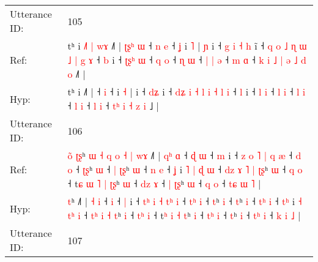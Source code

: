 \documentclass[10pt]{article}
\DeclareRobustCommand{\hl}[1]{{\textcolor{red}{#1}}}
\begin{document}
\begin{longtable}{ll}
 \\
\midrule
Utterance ID: & 105 \\
Ref: & tʰ i\hl{ }\hl{˩}\hl{˥}\hl{ }\hl{|}\hl{ }\hl{w}\hl{ɤ} ˩˥ |\hl{ }\hl{ʈ}\hl{ʂ}\hl{ʰ}\hl{ }\hl{ɯ} ˧\hl{ }\hl{n} \hl{e} ˧\hl{ }\hl{ʝ} i \hl{˥} |\hl{ }\hl{ɲ} i ˧\hl{ }\hl{g}\hl{ }\hl{i} \hl{˧}\hl{ }\hl{h} i\hl{̃} ˧ \hl{q}\hl{ }\hl{o} \hl{˩} \hl{ɳ} \hl{ɯ} \hl{˩} \hl{|} \hl{g} \hl{ɤ} ˧ \hl{b} i ˧ \hl{ʈ}\hl{ʂ}\hl{ʰ} \hl{ɯ} ˧ \hl{q} \hl{o} ˧ \hl{ɳ} \hl{ɯ} ˧\hl{ }\hl{|} \hl{|} \hl{ə} ˧ \hl{m} \hl{ɑ} ˧\hl{ }\hl{k}\hl{ }\hl{i} \hl{˩}\hl{ }\hl{|} \hl{ə} \hl{˩} \hl{d} \hl{o} ˩\hl{˥} |
 \\
Hyp: & tʰ i\hl{}\hl{}\hl{}\hl{}\hl{}\hl{}\hl{}\hl{} ˩˥ |\hl{}\hl{}\hl{}\hl{}\hl{}\hl{} ˧\hl{}\hl{} \hl{i} ˧\hl{}\hl{} i \hl{˧} |\hl{}\hl{} i ˧\hl{}\hl{}\hl{}\hl{} \hl{}\hl{d}\hl{ʑ} i\hl{} ˧ \hl{}\hl{d}\hl{ʑ} \hl{i} \hl{˧} \hl{l} \hl{i} \hl{˧} \hl{l} \hl{i} ˧ \hl{l} i ˧ \hl{}\hl{}\hl{l} \hl{i} ˧ \hl{l} \hl{i} ˧ \hl{l} \hl{i} ˧\hl{}\hl{} \hl{l} \hl{i} ˧ \hl{l} \hl{i} ˧\hl{}\hl{}\hl{}\hl{} \hl{}\hl{t}\hl{ʰ} \hl{i} \hl{˧} \hl{z} \hl{i} ˩\hl{} |
 \\
\midrule
Utterance ID: & 106 \\
Ref: & \hl{o}\hl{̃}\hl{ }\hl{ʈ}\hl{ʂ}ʰ\hl{ }\hl{ɯ}\hl{ }\hl{˧}\hl{ }\hl{q}\hl{ }\hl{o}\hl{ }\hl{˧}\hl{ }\hl{|}\hl{ }\hl{w}\hl{ɤ} ˩˥ | \hl{q}\hl{ʰ} \hl{ɑ} ˧\hl{ }\hl{ɖ} \hl{ɯ} ˧ \hl{m} i ˧ \hl{}\hl{z} \hl{o} \hl{˥} \hl{|}\hl{ }\hl{q} \hl{æ} ˧ \hl{}\hl{d} \hl{o} ˧ \hl{ʈ}\hl{ʂ}ʰ \hl{ɯ} ˧\hl{ }\hl{|} \hl{ʈ}\hl{ʂ}ʰ \hl{ɯ} ˧ \hl{}\hl{n} \hl{e} ˧ \hl{}\hl{ʝ} i \hl{˥} \hl{|}\hl{ }\hl{ɖ} \hl{ɯ} ˧ \hl{d}\hl{z}\hl{ }\hl{ɤ} \hl{˥} \hl{|} \hl{ʈ}\hl{ʂ}ʰ \hl{ɯ} ˧ \hl{}\hl{q} \hl{o} ˧ t\hl{ɕ}\hl{ }\hl{ɯ} \hl{˥} \hl{|} \hl{ʈ}\hl{ʂ}ʰ \hl{ɯ} ˧ \hl{d}\hl{z} \hl{ɤ} ˧\hl{ }\hl{|} \hl{ʈ}\hl{ʂ}ʰ \hl{ɯ} ˧ \hl{}\hl{q} \hl{o} ˧ \hl{t}\hl{ɕ} \hl{ɯ} \hl{˥} |
 \\
Hyp: & \hl{}\hl{}\hl{}\hl{}\hl{t}ʰ\hl{}\hl{}\hl{}\hl{}\hl{}\hl{}\hl{}\hl{}\hl{}\hl{}\hl{}\hl{}\hl{}\hl{}\hl{} ˩˥ | \hl{}\hl{˧} \hl{i} ˧\hl{}\hl{} \hl{i} ˧ \hl{|} i ˧ \hl{t}\hl{ʰ} \hl{i} \hl{˧} \hl{}\hl{t}\hl{ʰ} \hl{i} ˧ \hl{t}\hl{ʰ} \hl{i} ˧ \hl{}\hl{t}ʰ \hl{i} ˧\hl{}\hl{} \hl{}\hl{t}ʰ \hl{i} ˧ \hl{t}\hl{ʰ} \hl{i} ˧ \hl{t}\hl{ʰ} i \hl{˧} \hl{}\hl{t}\hl{ʰ} \hl{i} ˧ \hl{}\hl{}\hl{t}\hl{ʰ} \hl{i} \hl{˧} \hl{}\hl{t}ʰ \hl{i} ˧ \hl{t}\hl{ʰ} \hl{i} ˧ t\hl{}\hl{}\hl{ʰ} \hl{i} \hl{˧} \hl{}\hl{t}ʰ \hl{i} ˧ \hl{t}\hl{ʰ} \hl{i} ˧\hl{}\hl{} \hl{}\hl{t}ʰ \hl{i} ˧ \hl{t}\hl{ʰ} \hl{i} ˧ \hl{}\hl{k} \hl{i} \hl{˩} |
 \\
\midrule
Utterance ID: & 107 \\

\end{longtable}
\end{document}

